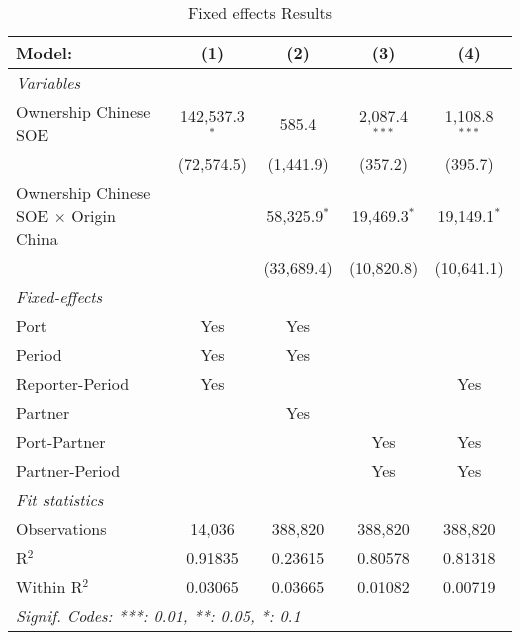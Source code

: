 \begin{table}[htbp]    \caption{Fixed effects Results}    \centering    \begin{adjustbox}{width = \textwidth, center}       \begin{tabular}{lcccc}          \tabularnewline \midrule \midrule          Model:                                       & (1)             & (2)            & (3)             & (4)\\            \midrule          \emph{Variables}\\          Ownership Chinese SOE                        & 142,537.3$^{*}$ & 585.4          & 2,087.4$^{***}$ & 1,108.8$^{***}$\\                                                          & (72,574.5)      & (1,441.9)      & (357.2)         & (395.7)\\             Ownership Chinese SOE $\times$ Origin China  &                 & 58,325.9$^{*}$ & 19,469.3$^{*}$  & 19,149.1$^{*}$\\                                                          &                 & (33,689.4)     & (10,820.8)      & (10,641.1)\\             \midrule          \emph{Fixed-effects}\\          Port                                         & Yes             & Yes            &                 & \\            Period                                       & Yes             & Yes            &                 & \\            Reporter-Period                              & Yes             &                &                 & Yes\\            Partner                                      &                 & Yes            &                 & \\            Port-Partner                                 &                 &                & Yes             & Yes\\            Partner-Period                               &                 &                & Yes             & Yes\\            \midrule          \emph{Fit statistics}\\          Observations                                 & 14,036          & 388,820        & 388,820         & 388,820\\            R$^2$                                        & 0.91835         & 0.23615        & 0.80578         & 0.81318\\            Within R$^2$                                 & 0.03065         & 0.03665        & 0.01082         & 0.00719\\            \midrule \midrule          \multicolumn{5}{l}{\emph{Signif. Codes: ***: 0.01, **: 0.05, *: 0.1}}\\       \end{tabular}    \end{adjustbox} \end{table}